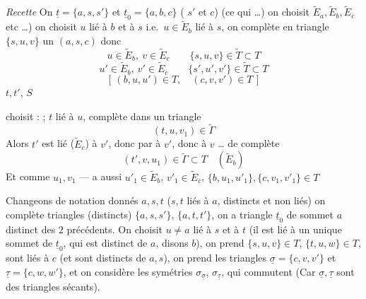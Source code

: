 \documentclass[11pt,a4paper]{article}
\begin{document}



\emph{Recette} On   $\underline{t}=\{a,s,s'\}$ et \struck{\ill{}}
$\underline{t}_0=\{a,b,c\}$ ( $s'$ et $c$) (ce qui \ill{} …) on
choisit $\widetilde{E}_a,\widetilde{E}_b,\widetilde{E}_c$ etc …) on choisit $u$
  lié à $b$ et à $s$ i.e.\ $u\in\widetilde{E}_b$ lié
à $s$, on complète en triangle $\{s,u,v\}$ un $(a,s,c)$ donc
\[
  u\in\widetilde{E}_b,\ v\in\widetilde{E}_c \qquad
  \{s,u,v\}\in\widetilde{T}\subset T
\]
\[
  u'\in\widetilde{E}_b,\ v'\in\widetilde{E}_c \qquad
  \{s',u',v'\}\in\widetilde{T}\subset T
\]
\[
  [\,(b,u,u')\in T,\quad(c,v,v')\in T\,]
\]
$t,t'$, \ill{} $S$

 choisit \ill{} :  ; $t$ lié à $u$,
\struck{\ill{}} complète dans un triangle
\[
  (t,u,v_1)\in\widetilde{\Gamma}
\]
Alors $t'$ est lié ($\widetilde{E}_c$) à $v'$, donc par à $v'$, donc à $v$ … de
complète
\[
  (t',v,u_1)\in\widetilde{\Gamma}\subset T\quad(\widetilde{E}_b)
\]
Et comme $u_1,v_1$ — a aussi $u'_1\in\widetilde{E}_b$, $v'_1\in\widetilde{E}_c$,
$\{b,u_1,u'_1\},\{c,v_1,v'_1\}\in T$


Changeons de notation donnés $a,s,t$ ($s,t$ liés à $a$, distincts et non liés) on
complète triangles (distincts) $\{a,s,s'\}$, $\{a,t,t'\}$, on a triangle
$\underline{t}_0$ de sommet $a$ distinct des $2$ précédents. On choisit $u\neq a$
lié à $s$ et à $t$ (il est lié à un unique sommet de $\underline{t}_0$, qui est
distinct de $a$, disons $b$), on prend $\{s,u,v\}\in T$, $\{t,u,w\}\in T$,
  sont liés à $c$ (et sont distincts de $a,s$), on
prend les triangles $\underline{\sigma}=\{c,v,v'\}$ et
$\underline{\tau}=\{c,w,w'\}$, et on considère les symétries
$\sigma_{\underline{\sigma}}$, $\sigma_{\underline{\tau}}$, qui commutent
(Car $\underline{\sigma},\underline{\tau}$
sont des triangles sécants).
\end{document}
